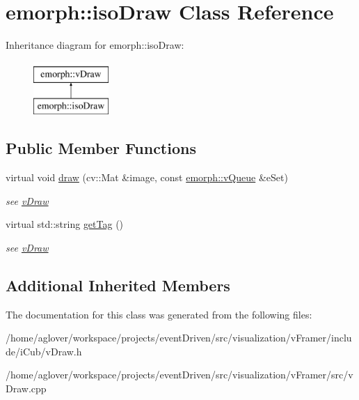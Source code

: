 \hypertarget{classemorph_1_1isoDraw}{\section{emorph\-:\-:iso\-Draw Class Reference}
\label{classemorph_1_1isoDraw}
}
Inheritance diagram for emorph\-:\-:iso\-Draw\-:\begin{figure}[H]
\begin{center}
\leavevmode
\includegraphics[height=2.000000cm]{classemorph_1_1isoDraw}
\end{center}
\end{figure}
\subsection*{Public Member Functions}
\begin{DoxyCompactItemize}
\item 
\hypertarget{classemorph_1_1isoDraw_aa30dd2dbb7d8f9f087f48582b6772d69}{virtual void \hyperlink{classemorph_1_1isoDraw_aa30dd2dbb7d8f9f087f48582b6772d69}{draw} (cv\-::\-Mat \&image, const \hyperlink{classemorph_1_1vQueue}{emorph\-::v\-Queue} \&e\-Set)}\label{classemorph_1_1isoDraw_aa30dd2dbb7d8f9f087f48582b6772d69}

\begin{DoxyCompactList}\small\item\em see \hyperlink{classemorph_1_1vDraw}{v\-Draw} \end{DoxyCompactList}\item 
\hypertarget{classemorph_1_1isoDraw_a9c62708bc4446b0e55cddb9f47e31d89}{virtual std\-::string \hyperlink{classemorph_1_1isoDraw_a9c62708bc4446b0e55cddb9f47e31d89}{get\-Tag} ()}\label{classemorph_1_1isoDraw_a9c62708bc4446b0e55cddb9f47e31d89}

\begin{DoxyCompactList}\small\item\em see \hyperlink{classemorph_1_1vDraw}{v\-Draw} \end{DoxyCompactList}\end{DoxyCompactItemize}
\subsection*{Additional Inherited Members}


The documentation for this class was generated from the following files\-:\begin{DoxyCompactItemize}
\item 
/home/aglover/workspace/projects/event\-Driven/src/visualization/v\-Framer/include/i\-Cub/v\-Draw.\-h\item 
/home/aglover/workspace/projects/event\-Driven/src/visualization/v\-Framer/src/v\-Draw.\-cpp\end{DoxyCompactItemize}
